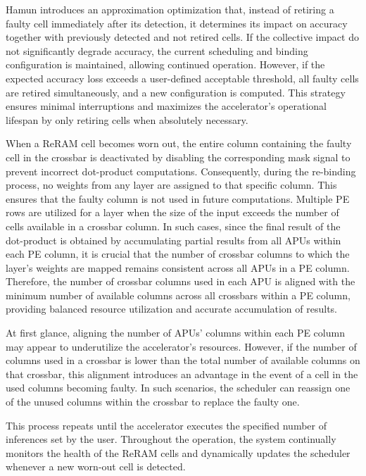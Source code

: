 
Hamun introduces an approximation optimization that, instead of retiring a faulty cell immediately after its detection, it determines its impact on accuracy together with previously detected and not retired cells. If the collective impact do not significantly degrade accuracy, the current scheduling and binding configuration is maintained, allowing continued operation. However, if the expected accuracy loss exceeds a user-defined acceptable threshold, all faulty cells are retired simultaneously, and a new configuration is computed. This strategy ensures minimal interruptions and maximizes the accelerator's operational lifespan by only retiring cells when absolutely necessary.

When a ReRAM cell becomes worn out, the entire column containing the faulty cell in the crossbar is deactivated by disabling the corresponding mask signal to prevent incorrect dot-product computations. Consequently, during the re-binding process, no weights from any layer are assigned to that specific column. This ensures that the faulty column is not used in future computations. Multiple PE rows are utilized for a layer when the size of the input exceeds the number of cells available in a crossbar column. In such cases, since the final result of the dot-product is obtained by accumulating partial results from all APUs within each PE column, it is crucial that the number of crossbar columns to which the layer's weights are mapped remains consistent across all APUs in a PE column. Therefore, the number of crossbar columns used in each APU is aligned with the minimum number of available columns across all crossbars within a PE column, providing balanced resource utilization and accurate accumulation of results.

At first glance, aligning the number of APUs' columns within each PE column may appear to underutilize the accelerator's resources. However, if the number of columns used in a crossbar is lower than the total number of available columns on that crossbar, this alignment introduces an advantage in the event of a cell in the used columns becoming faulty. In such scenarios, the scheduler can reassign one of the unused columns within the crossbar to replace the faulty one.

This process repeats until the accelerator executes the specified number of inferences set by the user. Throughout the operation, the system continually monitors the health of the ReRAM cells and dynamically updates the scheduler whenever a new worn-out cell is detected.


